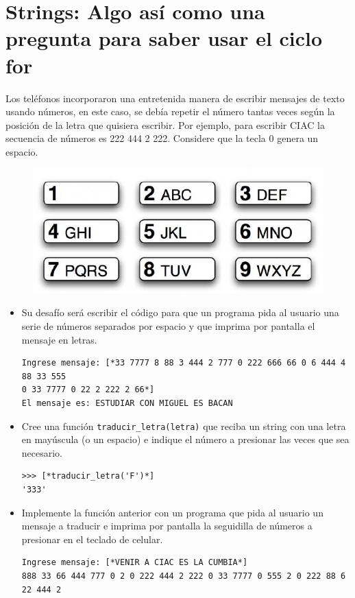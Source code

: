 \section{Strings: Algo así como una pregunta para saber usar el ciclo for}

Los teléfonos incorporaron una entretenida manera de escribir mensajes de texto usando números, en este caso, se debía repetir el número tantas veces según la posición de la letra que quisiera escribir. Por ejemplo, para escribir CIAC la secuencia de números es 222 444 2 222. Considere que la tecla 0 genera un espacio.

\begin{figure}[h]
    \centering
    \includegraphics{Guia/teclado.png}
\end{figure}

\begin{itemize}
    \item Su desafío será escribir el código para que un programa pida al usuario una serie de números separados por espacio y que imprima por pantalla el mensaje en letras.
\begin{lstlisting}[style=consola]
Ingrese mensaje: [*33 7777 8 88 3 444 2 777 0 222 666 66 0 6 444 4 88 33 555 
0 33 7777 0 22 2 222 2 66*]
El mensaje es: ESTUDIAR CON MIGUEL ES BACAN
\end{lstlisting}
    \item Cree una función \texttt{traducir\_letra(letra)} que reciba un string con una letra en mayúscula (o un espacio) e indique el número a presionar las veces que sea necesario.
\begin{lstlisting}[style=consola]
>>> [*traducir_letra('F')*]
'333'
\end{lstlisting}
    \item Implemente la función anterior con un programa que pida al usuario un mensaje a traducir e imprima por pantalla la seguidilla de números a presionar en el teclado de celular.
\begin{lstlisting}[style=consola]
Ingrese mensaje: [*VENIR A CIAC ES LA CUMBIA*]
888 33 66 444 777 0 2 0 222 444 2 222 0 33 7777 0 555 2 0 222 88 6 22 444 2
\end{lstlisting}
\end{itemize}